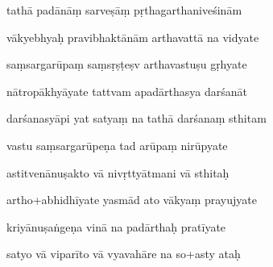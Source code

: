 \documentclass[article,12pt,a4paper]{memoir}%
\newcounter{parCount}
\begin{document}
	  
	  \pstart {} tathā padānāṃ sarveṣāṃ pṛthagarthaniveśinām 
	{}
	\pend%
      

	  
	  \pstart \leavevmode%
	vākyebhyaḥ pravibhaktānām arthavattā na vidyate 
	{}
	\pend%
      

	  
	  \pstart {} saṃsargarūpaṃ saṃsṛṣṭeṣv arthavastuṣu gṛhyate 
	{}
	\pend%
      

	  
	  \pstart \leavevmode%
	nātropākhyāyate tattvam apadārthasya darśanāt 
	{}
	\pend%
      

	  
	  \pstart {} darśanasyāpi yat satyaṃ na tathā darśanaṃ sthitam 
	{}
	\pend%
      

	  
	  \pstart \leavevmode%
	vastu saṃsargarūpeṇa tad arūpaṃ nirūpyate 
	{}
	\pend%
      

	  
	  \pstart {} astitvenānuṣakto vā nivṛttyātmani vā sthitaḥ 
	{}
	\pend%
      

	  
	  \pstart \leavevmode%
	artho+abhidhīyate yasmād ato vākyaṃ prayujyate 
	{}
	\pend%
      

	  
	  \pstart {} kriyānuṣaṅgeṇa vinā na padārthaḥ pratīyate 
	{}
	\pend%
      

	  
	  \pstart \leavevmode%
	satyo vā viparīto vā vyavahāre na so+asty ataḥ 
	{}
	\pend%
      
\end{document}

